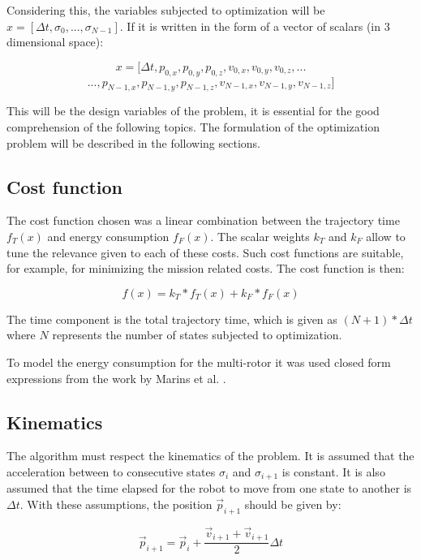 Considering this, the variables subjected to optimization will be $x=[\Delta t, \sigma_0, ..., \sigma_{N-1}]$. If it is written in the form of a vector of scalars (in 3 dimensional space):

$$x=[\Delta t, p_{0,x}, p_{0,y}, p_{0,z}, v_{0,x}, v_{0,y}, v_{0,z}, ... $$
$$..., p_{N-1,x}, p_{N-1,y}, p_{N-1,z}, v_{N-1,x}, v_{N-1,y}, v_{N-1,z}]$$

This will be the design variables of the problem, it is essential for the good comprehension of the following topics. The formulation of the optimization problem will be described in the following sections.

\subsection{Cost function}
The cost function chosen was a linear combination between the trajectory time $f_T(x)$ and energy consumption $ f_F(x)$. The scalar weights $k_T$ and $k_F$ allow to tune the relevance given to each of these costs. Such cost functions are suitable, for example, for minimizing the mission related costs. The cost function is then:

 \begin{equation}
     f(x)= k_T * f_T(x) + k_F * f_F(x)
     \label{eq:CostFunction}
 \end{equation}
 
 The time component is the total trajectory time, which is given as $(N+1)*\Delta t$ where $N$ represents the number of states subjected to optimization.
 
 To model the energy consumption for the multi-rotor it was used closed form expressions from the work by Marins et al. \cite{fuel}.  



\subsection{Kinematics}
The algorithm must respect the kinematics of the problem. It is assumed that the acceleration between to consecutive states $\sigma_i$ and $\sigma_{i+1}$ is constant. It is also assumed that the time elapsed for the robot to move from one state to another is $\Delta t$. With these assumptions, the position $\vec{p}_{i+1}$ should be given by:

\begin{equation}
    \vec{p}_{i+1}=\vec{p}_{i} + \frac{\vec{v}_{i+1}+ \vec{v}_{i+1} }{2}\Delta t
    \label{kinematics}
\end{equation}

